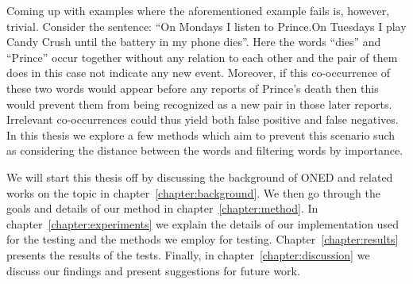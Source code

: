 Coming up with examples where the aforementioned example fails is, however, trivial. Consider the sentence: ``On Mondays I listen to Prince.On Tuesdays I play Candy Crush until the battery in my phone dies''. Here the words ``dies'' and ``Prince'' occur together without any relation to each other and the pair of them does in this case not indicate any new event. Moreover, if this co-occurrence of these two words would appear before any reports of Prince's death then this would prevent them from being recognized as a new pair in those later reports. Irrelevant co-occurrences could thus yield both false positive and false negatives. In this thesis we explore a few methods which aim to prevent this scenario such as considering the distance between the words and filtering words by importance.

We will start this thesis off by discussing the background of ONED and related works on the topic in chapter~\ref{chapter:background}. We then go through the goals and details of our method in chapter~\ref{chapter:method}. In chapter~\ref{chapter:experiments} we explain the details of our implementation used for the testing and the methods we employ for testing. Chapter~\ref{chapter:results} presents the results of the tests. Finally, in chapter~\ref{chapter:discussion} we discuss our findings and present suggestions for future work.
